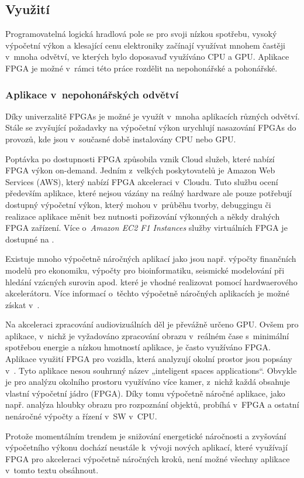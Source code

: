 \documentclass[a4paper, twoside, 11pt]{article}
\begin{document}
			
			\subsection{Využití}
			Programovatelná logická hradlová pole se pro svoji nízkou spotřebu, vysoký výpočetní výkon a klesající cenu elektroniky začínají využívat mnohem častěji v~mnoha odvětví, ve kterých bylo doposavaď využíváno CPU a GPU. Aplikace FPGA je možné v~rámci této práce rozdělit na nepohonářské a pohonářské.

			\subsubsection{Aplikace v~nepohonářských odvětví}
				Díky univerzalitě FPGAs je možné je využít v~mnoha aplikacích různých odvětví. Stále se zvyšující požadavky na výpočetní výkon urychlují nasazování FPGAs do provozů, kde jsou v~současné době instalovány CPU nebo GPU.\par
				Poptávka po dostupnosti FPGA způsobila vznik Cloud služeb, které nabízí FPGA výkon on-demand. Jedním z~velkých poskytovatelů je Amazon Web Services (AWS), který nabízí FPGA akceleraci v~Cloudu. Tuto službu ocení především aplikace, které nejsou vázány na reálný hardware ale pouze potřebují dostupný výpočetní výkon, který mohou v~průběhu tvorby, debuggingu či realizace aplikace měnit bez nutnosti pořizování výkonných a někdy drahých FPGA zařízení. Více o~\textit{Amazon EC2 F1 Instances} služby virtuálních FPGA je dostupné na \cite{amazon-ec2-f1}.\par
				Existuje mnoho výpočetně náročných aplikací jako jsou např. výpočty finančních modelů pro ekonomiku, výpočty pro bioinformatiku, seismické modelování při hledání vzácných surovin apod. které je vhodné realizovat pomocí hardwaerového akcelerátoru. Více informací o~těchto výpočetně náročných aplikacích je možné získat v~\cite{wim-high-performance-computing-using-fpgas}.\par
				Na akceleraci zpracování audiovizuálních děl je převážně určeno GPU. Ovšem pro aplikace, v~nichž je vyžadováno zpracování obrazu v~reálném čase s~minimální spotřebou energie a nízkou hmotností aplikace, je často využíváno FPGA. Aplikace využití FPGA pro vozidla, která analyzují okolní prostor jsou popsány v~\cite{andina-advanced-features-and-industrial-applications-of-fpga}. Tyto aplikace nesou souhrnný název „inteligent spaces applications“. Obvykle je pro analýzu okolního prostoru využíváno více kamer, z~nichž každá obsahuje vlastní výpočetní jádro (FPGA). Díky tomu výpočetně náročné aplikace, jako např. analýza hloubky obrazu pro rozpoznání objektů, probíhá v~FPGA a ostatní nenáročné výpočty a řízení v~SW v~CPU. \cite{andina-advanced-features-and-industrial-applications-of-fpga}\par
				Protože momentálním trendem je snižování energetické náročnosti a zvyšování výpočetního výkonu dochází neustále k~vývoji nových aplikací, které využívají FPGA pro akceleraci výpočetně náročných kroků, není možné všechny aplikace v~tomto textu obsáhnout.
\end{document}
